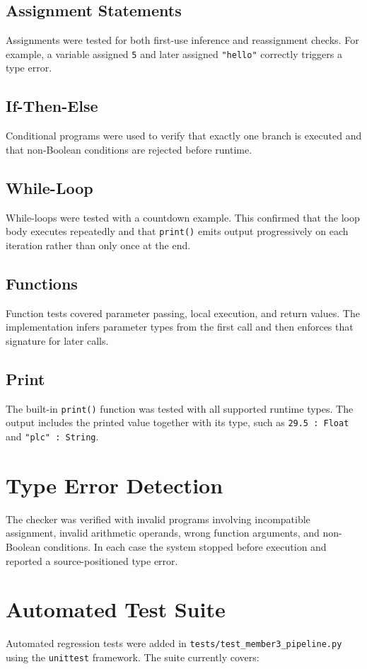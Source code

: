 \subsection{Assignment Statements}
Assignments were tested for both first-use inference and reassignment checks.
For example, a variable assigned \texttt{5} and later assigned
\texttt{"hello"} correctly triggers a type error.

\subsection{If-Then-Else}
Conditional programs were used to verify that exactly one branch is executed and
that non-Boolean conditions are rejected before runtime.

\subsection{While-Loop}
While-loops were tested with a countdown example. This confirmed that the loop
body executes repeatedly and that \texttt{print()} emits output progressively on
each iteration rather than only once at the end.

\subsection{Functions}
Function tests covered parameter passing, local execution, and return values.
The implementation infers parameter types from the first call and then enforces
that signature for later calls.

\subsection{Print}
The built-in \texttt{print()} function was tested with all supported runtime
types. The output includes the printed value together with its type, such as
\texttt{29.5 : Float} and \texttt{"plc" : String}.

\section{Type Error Detection}
The checker was verified with invalid programs involving incompatible
assignment, invalid arithmetic operands, wrong function arguments, and
non-Boolean conditions. In each case the system stopped before execution and
reported a source-positioned type error.

\section{Automated Test Suite}
Automated regression tests were added in
\texttt{tests/test\_member3\_pipeline.py} using the \texttt{unittest}
framework. The suite currently covers:

